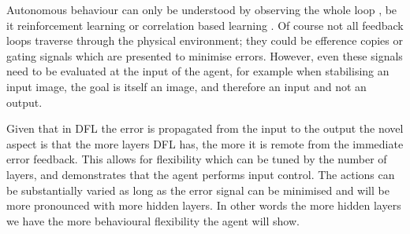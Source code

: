\documentclass{aamas2018}
\begin{document}
Autonomous behaviour can only be understood by observing the whole
loop \cite{Porr2005kyb}, be it reinforcement learning \cite{Sutton98}
or correlation based learning \cite{Verschure91}. Of course not all
feedback loops traverse through the physical environment; they could
be efference copies \cite{Uexkuell26,Graesser86} or gating signals
which are presented to minimise errors. However, even these signals
need to be evaluated at the input of the agent, for example when
stabilising an input image, the goal is itself an image, and therefore
an input and not an output.

Given that in DFL the error is propagated from the input to the output
the novel aspect is that the more layers DFL has, the more it is remote
from the immediate error feedback. This allows for flexibility which
can be tuned by the number of layers, and demonstrates that the agent
performs input control. The actions can be substantially varied as long as
the error signal can be minimised and will be more pronounced with
more hidden layers. In other words the more hidden layers we have the
more behavioural flexibility the agent will show.




\end{document}
